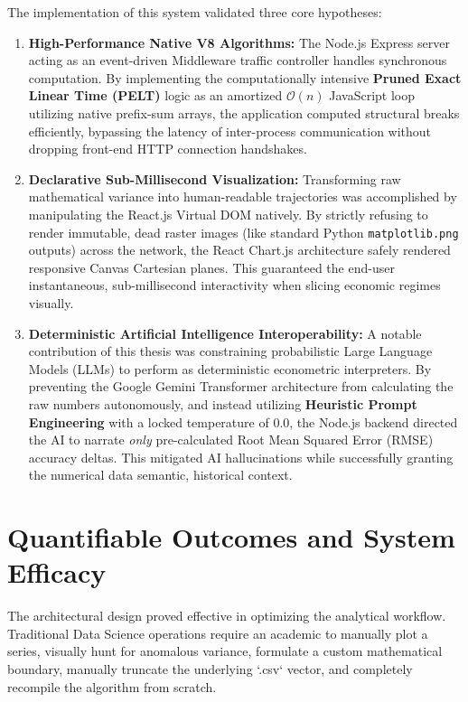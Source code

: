 The implementation of this system validated three core hypotheses:
\begin{enumerate}
    \item \textbf{High-Performance Native V8 Algorithms:} The Node.js Express server acting as an event-driven Middleware traffic controller handles synchronous computation. By implementing the computationally intensive \textbf{Pruned Exact Linear Time (PELT)} logic as an amortized $\mathcal{O}(n)$ JavaScript loop utilizing native prefix-sum arrays, the application computed structural breaks efficiently, bypassing the latency of inter-process communication without dropping front-end HTTP connection handshakes.
    \item \textbf{Declarative Sub-Millisecond Visualization:} Transforming raw mathematical variance into human-readable trajectories was accomplished by manipulating the React.js Virtual DOM natively. By strictly refusing to render immutable, dead raster images (like standard Python \texttt{matplotlib.png} outputs) across the network, the React Chart.js architecture safely rendered responsive Canvas Cartesian planes. This guaranteed the end-user instantaneous, sub-millisecond interactivity when slicing economic regimes visually.
    \item \textbf{Deterministic Artificial Intelligence Interoperability:} A notable contribution of this thesis was constraining probabilistic Large Language Models (LLMs) to perform as deterministic econometric interpreters. By preventing the Google Gemini Transformer architecture from calculating the raw numbers autonomously, and instead utilizing \textbf{Heuristic Prompt Engineering} with a locked temperature of $0.0$, the Node.js backend directed the AI to narrate \textit{only} pre-calculated Root Mean Squared Error (RMSE) accuracy deltas. This mitigated AI hallucinations while successfully granting the numerical data semantic, historical context.
\end{enumerate}

\section{Quantifiable Outcomes and System Efficacy}
The architectural design proved effective in optimizing the analytical workflow. Traditional Data Science operations require an academic to manually plot a series, visually hunt for anomalous variance, formulate a custom mathematical boundary, manually truncate the underlying `.csv` vector, and completely recompile the algorithm from scratch. 

